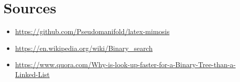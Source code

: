 \chapter{Sources}
\begin{itemize}
    \item \url{https://github.com/Pseudomanifold/latex-mimosis}
    \item \url{https://en.wikipedia.org/wiki/Binary_search}
    \item \url{https://www.quora.com/Why-is-look-up-faster-for-a-Binary-Tree-than-a-Linked-List}
\end{itemize}